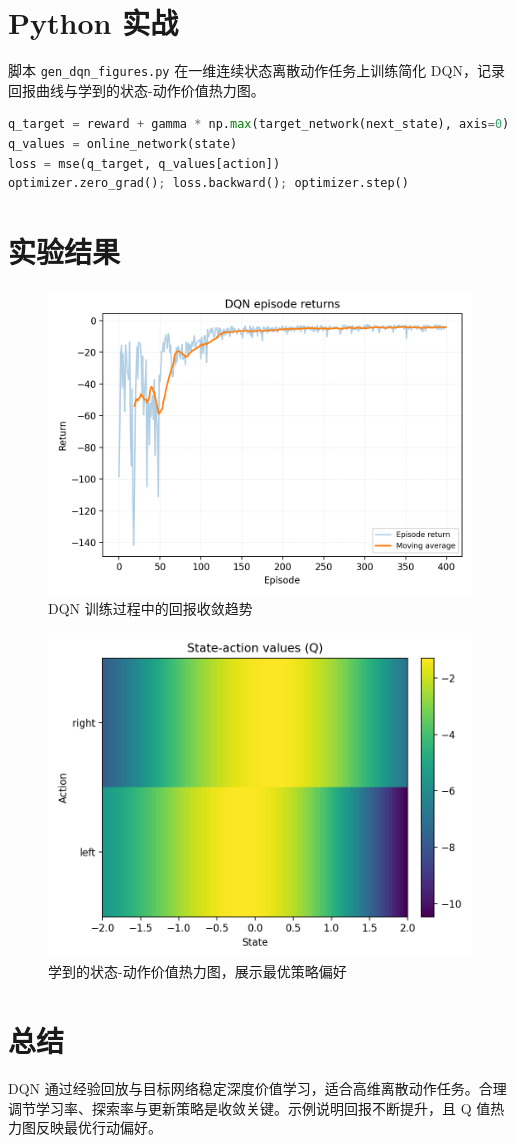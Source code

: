 \documentclass[UTF8,zihao=-4]{ctexart}
\begin{document}
\section{Python 实战}
脚本 \texttt{gen\_dqn\_figures.py} 在一维连续状态离散动作任务上训练简化 DQN，记录回报曲线与学到的状态-动作价值热力图。
\begin{lstlisting}[language=Python,caption={脚本 gen_dqn_figures.py 片段}]
q_target = reward + gamma * np.max(target_network(next_state), axis=0)
q_values = online_network(state)
loss = mse(q_target, q_values[action])
optimizer.zero_grad(); loss.backward(); optimizer.step()
\end{lstlisting}

\section{实验结果}
\begin{figure}[H]
  \centering
  \includegraphics[width=0.8\linewidth]{dqn_returns.png}
  \caption{DQN 训练过程中的回报收敛趋势}
  \label{fig:dqn_returns_cn}
\end{figure}

\begin{figure}[H]
  \centering
  \includegraphics[width=0.82\linewidth]{dqn_q_values.png}
  \caption{学到的状态-动作价值热力图，展示最优策略偏好}
  \label{fig:dqn_q_values_cn}
\end{figure}

\FloatBarrier
\section{总结}
DQN 通过经验回放与目标网络稳定深度价值学习，适合高维离散动作任务。合理调节学习率、探索率与更新策略是收敛关键。示例说明回报不断提升，且 Q 值热力图反映最优行动偏好。
\end{document}
